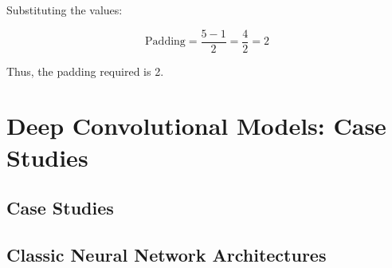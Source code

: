 \documentclass[letterpaper,12pt,notitlepage,twoside]{report}
\begin{document}
Substituting the values:

\[
\text{Padding} = \frac{5 - 1}{2} = \frac{4}{2} = 2
\]

Thus, the padding required is 2.

\section{Deep Convolutional Models: Case Studies}

\subsection{Case Studies}
\subsection*{Classic Neural Network Architectures}
\end{document}
